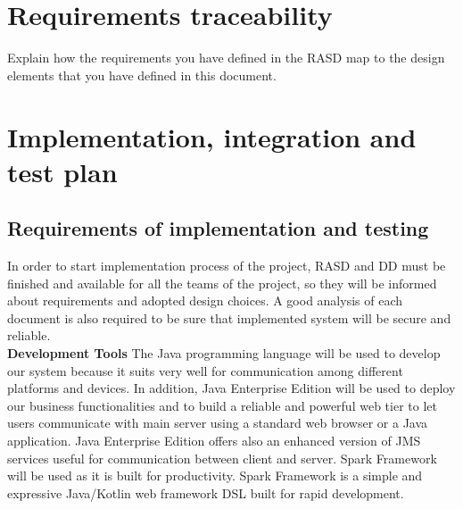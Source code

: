 \documentclass[a4paper, hidelinks, 12pt]{report}
\begin{document}
	
	\chapter{Requirements traceability}
	Explain how the requirements you have defined in the RASD map to the design elements that you have defined in this document.
	
	\chapter{Implementation, integration and test plan}
	\section{Requirements of implementation and testing}
In order to start implementation process of the project, RASD and DD must be finished and available for all the teams of the project, so they will be informed about requirements and adopted design choices. A good analysis of each document is also required to be sure that implemented system will be secure and reliable.\\

\textbf{Development Tools} The Java programming language will be used to develop our system because it suits very well for communication among different platforms and devices. In addition, Java Enterprise Edition will be used to deploy our business functionalities and to build a reliable and powerful web tier to let users communicate with main server using a standard web browser or a Java application. Java Enterprise Edition offers also an enhanced version of JMS services useful for communication between client and server. Spark Framework will be used as it is built for productivity. Spark Framework is a simple and expressive Java/Kotlin web framework DSL built for rapid development. \\
\end{document}
